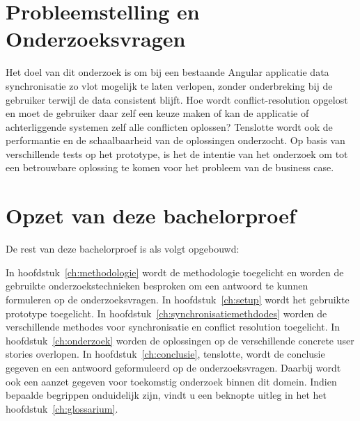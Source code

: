\section{Probleemstelling en Onderzoeksvragen}
\label{sec:onderzoeksvragen}
Het doel van dit onderzoek is om bij een bestaande Angular applicatie data synchronisatie zo vlot mogelijk te laten verlopen, zonder onderbreking bij de gebruiker terwijl de data consistent blijft. Hoe wordt conflict-resolution opgelost en moet de gebruiker daar zelf een keuze maken of kan de applicatie of achterliggende systemen zelf alle conflicten oplossen? Tenslotte wordt ook de performantie en de schaalbaarheid van de oplossingen onderzocht. Op basis van verschillende tests op het prototype, is het de intentie van het onderzoek om tot een betrouwbare oplossing te komen voor het probleem van de business case.

\section{Opzet van deze bachelorproef}
\label{sec:opzet-bachelorproef}


De rest van deze bachelorproef is als volgt opgebouwd:

In hoofdstuk~\ref{ch:methodologie} wordt de methodologie toegelicht en worden de gebruikte onderzoekstechnieken besproken om een antwoord te kunnen formuleren op de onderzoeksvragen.
In hoofdstuk~\ref{ch:setup} wordt het gebruikte prototype toegelicht.
In hoofdstuk~\ref{ch:synchronisatiemethdodes} worden de verschillende methodes voor synchronisatie en conflict resolution toegelicht.
In hoofdstuk~\ref{ch:onderzoek} worden de oplossingen op de verschillende concrete user stories overlopen.
In hoofdstuk~\ref{ch:conclusie}, tenslotte, wordt de conclusie gegeven en een antwoord geformuleerd op de onderzoeksvragen. Daarbij wordt ook een aanzet gegeven voor toekomstig onderzoek binnen dit domein.
Indien bepaalde begrippen onduidelijk zijn, vindt u een beknopte uitleg in het het hoofdstuk~\ref{ch:glossarium}.

